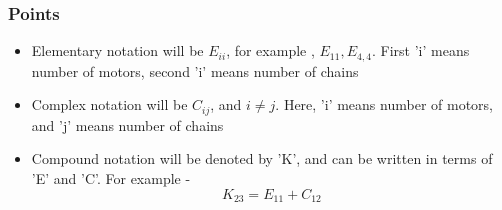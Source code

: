 \documentclass{article}
\begin{document}
\subsubsection*{Points}
\begin{itemize}
  \item Elementary notation will be $E_{ii}$, for example , $E_{11}, E_{4,4}$. First 'i' means number of motors, second 'i' means number of chains 
  \item Complex notation will be $C_{ij}$, and $i \neq j$. Here, 'i' means number of motors, and 'j' means number of chains 
  \item Compound notation will be denoted by 'K', and can be written in terms of 'E' and 'C'. For example - 
  $$K_{23} = E_{11} + C_{12}$$
\end{itemize}
\hrulefill
\end{document}
